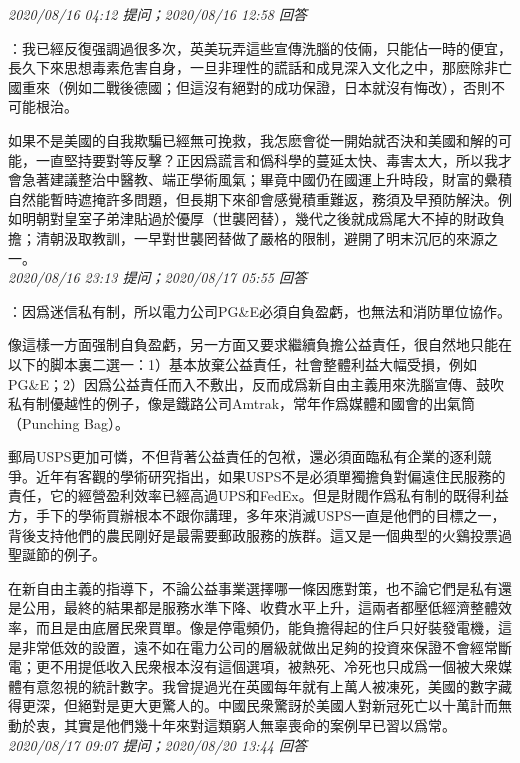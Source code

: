 \documentclass[twocolumn]{ctexart}
\begin{document}
\textit{\hfill\noindent\small 2020/08/16 04:12 提问；2020/08/16 12:58 回答}

：我已經反復强調過很多次，英美玩弄這些宣傳洗腦的伎倆，只能佔一時的便宜，長久下來思想毒素危害自身，一旦非理性的謊話和成見深入文化之中，那麽除非亡國重來（例如二戰後德國；但這沒有絕對的成功保證，日本就沒有悔改），否則不可能根治。

如果不是美國的自我欺騙已經無可挽救，我怎麽會從一開始就否決和美國和解的可能，一直堅持要對等反擊？正因爲謊言和僞科學的蔓延太快、毒害太大，所以我才會急著建議整治中醫教、端正學術風氣；畢竟中國仍在國運上升時段，財富的纍積自然能暫時遮掩許多問題，但長期下來卻會感覺積重難返，務須及早預防解決。例如明朝對皇室子弟津貼過於優厚（世襲罔替），幾代之後就成爲尾大不掉的財政負擔；清朝汲取教訓，一早對世襲罔替做了嚴格的限制，避開了明末沉厄的來源之一。
\\

\textit{\hfill\noindent\small 2020/08/16 23:13 提问；2020/08/17 05:55 回答}

：因爲迷信私有制，所以電力公司PG\&E必須自負盈虧，也無法和消防單位協作。

像這樣一方面强制自負盈虧，另一方面又要求繼續負擔公益責任，很自然地只能在以下的脚本裏二選一：1）基本放棄公益責任，社會整體利益大幅受損，例如PG\&E；2）因爲公益責任而入不敷出，反而成爲新自由主義用來洗腦宣傳、鼓吹私有制優越性的例子，像是鐵路公司Amtrak，常年作爲媒體和國會的出氣筒（Punching Bag）。

郵局USPS更加可憐，不但背著公益責任的包袱，還必須面臨私有企業的逐利競爭。近年有客觀的學術研究指出，如果USPS不是必須單獨擔負對偏遠住民服務的責任，它的經營盈利效率已經高過UPS和FedEx。但是財閥作爲私有制的既得利益方，手下的學術買辦根本不跟你講理，多年來消滅USPS一直是他們的目標之一，背後支持他們的農民剛好是最需要郵政服務的族群。這又是一個典型的火鷄投票過聖誕節的例子。

在新自由主義的指導下，不論公益事業選擇哪一條因應對策，也不論它們是私有還是公用，最終的結果都是服務水準下降、收費水平上升，這兩者都壓低經濟整體效率，而且是由底層民衆買單。像是停電頻仍，能負擔得起的住戶只好裝發電機，這是非常低效的設置，遠不如在電力公司的層級就做出足夠的投資來保證不會經常斷電；更不用提低收入民衆根本沒有這個選項，被熱死、冷死也只成爲一個被大衆媒體有意忽視的統計數字。我曾提過光在英國每年就有上萬人被凍死，美國的數字藏得更深，但絕對是更大更驚人的。中國民衆驚訝於美國人對新冠死亡以十萬計而無動於衷，其實是他們幾十年來對這類窮人無辜喪命的案例早已習以爲常。
\\

\textit{\hfill\noindent\small 2020/08/17 09:07 提问；2020/08/20 13:44 回答}
\end{document}
